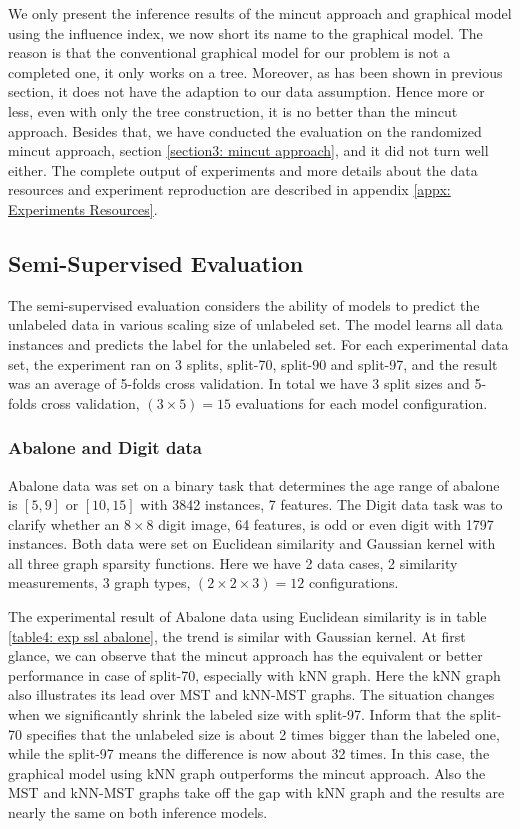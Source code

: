 We only present the inference results of the mincut approach and graphical model using the influence index, we now short its name to the graphical model. The reason is that the conventional graphical model for our problem is not a completed one, it only works on a tree. Moreover, as has been shown in previous section, it does not have the adaption to our data assumption. Hence more or less, even with only the tree construction, it is no better than the mincut approach. Besides that, we have conducted the evaluation on the randomized mincut approach, section \ref{section3: mincut approach}, and it did not turn well either. The complete output of experiments and more details about the data resources and experiment reproduction are described in appendix \ref{appx: Experiments Resources}.

\subsection{Semi-Supervised Evaluation}
\label{subsection: exp ssl}

The semi-supervised evaluation considers the ability of models to predict the unlabeled data in various scaling size of unlabeled set. The model learns all data instances and predicts the label for the unlabeled set. For each experimental data set, the experiment ran on 3 splits, split-70, split-90 and split-97, and the result was an average of 5-folds cross validation. In total we have 3 split sizes and 5-folds cross validation, $(3\times5) = 15$ evaluations for each model configuration.

\subsubsection*{Abalone and Digit data}
Abalone data was set on a binary task that determines the age range of abalone is $[5, 9]$ or $[10, 15]$ with 3842 instances, 7 features. The Digit data task was to clarify whether an $8\times8$ digit image, 64 features, is odd or even digit with 1797 instances. Both data were set on Euclidean similarity and Gaussian kernel with all three graph sparsity functions. Here we have 2 data cases, 2 similarity measurements, 3 graph types, $(2 \times 2 \times 3) = 12$ configurations. 

The experimental result of Abalone data using Euclidean similarity is in table \ref{table4: exp ssl abalone}, the trend is similar with Gaussian kernel. At first glance, we can observe that the mincut approach has the equivalent or better performance in case of split-70, especially with kNN graph. Here the kNN graph also illustrates its lead over MST and kNN-MST graphs. The situation changes when we significantly shrink the labeled size with split-97. Inform that the split-70 specifies that the unlabeled size is about 2 times bigger than the labeled one, while the split-97 means the difference is now about 32 times. In this case, the graphical model using kNN graph outperforms the mincut approach. Also the MST and kNN-MST graphs take off the gap with kNN graph and the results are nearly the same on both inference models.

